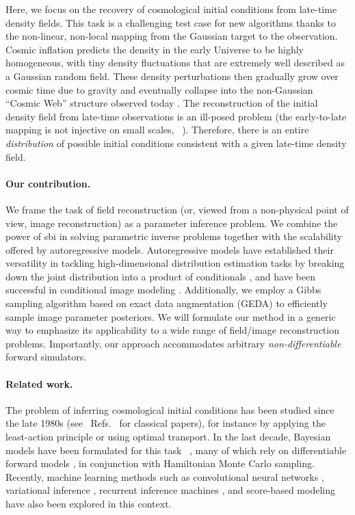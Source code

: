 Here, we focus on the recovery of cosmological initial conditions from late-time density fields. This task is a challenging test case for new algorithms thanks to the non-linear, non-local mapping from the Gaussian target to the observation.  Cosmic inflation predicts the density in the early Universe to be highly homogeneous, with tiny density fluctuations that are extremely well described as a Gaussian random field. These density perturbations then gradually grow over cosmic time due to gravity and eventually collapse into the non-Gaussian ``Cosmic Web'' structure observed today \cite{Bond:1995yt}. 
The reconstruction of the initial density field from late-time observations is an ill-posed problem (the early-to-late mapping is not injective on small scales, ~\cite[\eg,][]{Brenier:2003xs}). Therefore, there is an entire {\it distribution} of possible initial conditions consistent with a given late-time density field. 

\paragraph{Our contribution.}  We frame the task of field reconstruction (or, viewed from a non-physical point of view, image reconstruction) as a parameter inference problem.  We combine the power of \gls*{sbi} in solving parametric inverse problems together with the scalability offered by autoregressive models. Autoregressive models have established their versatility in tackling high-dimensional distribution estimation tasks by breaking down the joint distribution into a product of conditionals \cite{Papamakarios:2017tec, Uria:2016aa}, and have been successful in conditional image modeling \cite{Oord:2016aa}. Additionally, we employ a Gibbs sampling algorithm based on exact data augmentation (GEDA) \cite{Marnissi:2019aa} to efficiently sample image parameter posteriors.
We will formulate our method in a generic way to emphasize its applicability to a wide range of field/image reconstruction problems. Importantly, our approach accommodates arbitrary \textit{non-differentiable} forward simulators.

\paragraph{Related work.} The problem of inferring cosmological initial conditions has been studied since the late 1980s (see \eg~Refs.~\cite{Croft:1996jw, Frisch:2001vw, Gramann:1993aa, Nusser:1992aa, Peebles:2020aa, Weinberg:1992aa} for classical papers), for instance by applying the least-action principle or using optimal transport. In the last decade, Bayesian models have been formulated for this task ~\cite[\eg,][]{Jasche:2012kq}, many of which rely on differentiable forward models \cite{Li:2022bsu, Modi:2020dyb}, in conjunction with Hamiltonian Monte Carlo sampling. 
Recently, machine learning methods such as convolutional neural networks \cite{Shallue:2022mhf, Chen:2023uup}, variational inference \cite{Modi:2022pzm}, recurrent inference machines \cite{Modi:2021acq}, and score-based modeling \cite{Legin:2023jxc} have also been explored in this context. 


